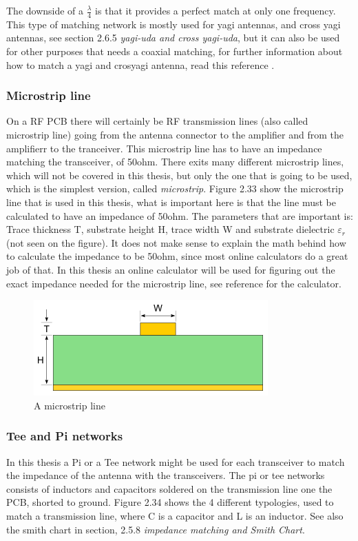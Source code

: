 The downside of a $\frac{\lambda}{4}$ is that it provides a perfect match at only one frequency. This type of matching network is mostly used for yagi antennas, and cross yagi antennas, see section 2.6.5 \textit{yagi-uda and cross yagi-uda}, but it can also be used for other purposes that needs a coaxial matching, for further information about how to match a yagi and crosyagi antenna, read this reference \cite{YagiMatching}. 

\subsubsection{Microstrip line}
On a RF PCB there will certainly be RF transmission lines (also called microstrip line) going from the antenna connector to the amplifier and from the amplifierr to the tranceiver. This microstrip line has to have an impedance matching the transceiver, of 50ohm. There exits many different microstrip lines, which will not be covered in this thesis, but only the one that is going to be used, which is the simplest version, called \textit{microstrip}. Figure 2.33 show the microstrip line that is used in this thesis, what is important here is that the line must be calculated to have an impedance of 50ohm. The parameters that are important is: Trace thickness T, substrate height H, trace width W and substrate dielectric $\varepsilon_r$ (not seen on the figure). It does not make sense to explain the math behind how to calculate the impedance to be 50ohm, since most online calculators do a great job of that. In this thesis an online calculator will be used for figuring out the exact impedance needed for the microstrip line, see reference for the calculator\cite{MicrostripCalcu}. 

\begin{figure}[h]
\centering
\includegraphics[scale=0.7]{figures/Microstrip.PNG}
\caption{A microstrip line}
\end{figure}

\subsubsection{Tee and Pi networks}
In this thesis a Pi or a Tee network might be used for each transceiver to match the impedance of the antenna with the transceivers. The pi or tee networks consists of inductors and capacitors soldered on the transmission line one the PCB, shorted to ground. Figure 2.34 shows the 4 different typologies, used to match a transmission line, where C is a capacitor and L is an inductor. See also the smith chart in section, 2.5.8 \textit{impedance matching and Smith Chart}.  

